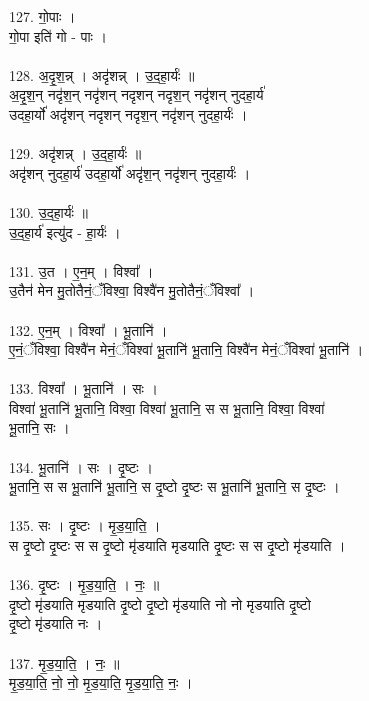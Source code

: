 127. गो॒पाः ।\\
गो॒पा इति॑ गो - पाः ।\\
\\
128. अ॒दृ॒श॒न्न् । अदृ॑शन्न् । उ॒द॒हा॒र्यः॑ ॥\\
अ॒दृ॒श॒न् नदृ॑श॒न् नदृ॑शन् नदृशन् नदृश॒न् नदृ॑शन् नुदहा॒र्य॑\\
उदहा॒र्यो॑ अदृ॑शन् नदृशन् नदृश॒न् नदृ॑शन् नुदहा॒र्यः॑ ।\\
\\
129. अदृ॑शन्न् । उ॒द॒हा॒र्यः॑ ॥\\
अदृ॑शन् नुदहा॒र्य॑ उदहा॒र्यो॑ अदृ॑श॒न् नदृ॑शन् नुदहा॒र्यः॑ ।\\
\\
130. उ॒द॒हा॒र्यः॑ ॥\\
उ॒द॒हा॒र्य॑ इत्यु॑द - हा॒र्यः॑ ।\\
\\
131. उ॒त । ए॒न॒म् । विश्वा᳚ ।\\
उ॒तैन॑ मेन मु॒तोतैनं॒ँविश्वा॒ विश्वै॑न मु॒तोतैनं॒ँविश्वा᳚ ।\\
\\
132. ए॒न॒म् । विश्वा᳚ । भू॒तानि॑ ।\\
ए॒नं॒ँविश्वा॒ विश्वै॑न मेनं॒ँविश्वा॑ भू॒तानि॑ भू॒तानि॒ विश्वै॑न मेनं॒ँविश्वा॑ भू॒तानि॑ ।\\
\\
133. विश्वा᳚ । भू॒तानि॑ । सः ।\\
विश्वा॑ भू॒तानि॑ भू॒तानि॒ विश्वा॒ विश्वा॑ भू॒तानि॒ स स भू॒तानि॒ विश्वा॒ विश्वा॑\\
भू॒तानि॒ सः ।\\
\\
134. भू॒तानि॑ । सः । दृ॒ष्टः ।\\
भू॒तानि॒ स स भू॒तानि॑ भू॒तानि॒ स दृ॒ष्टो दृ॒ष्टः स भू॒तानि॑ भू॒तानि॒ स दृ॒ष्टः ।\\
\\
135. सः । दृ॒ष्टः । मृ॒ड॒या॒ति॒ ।\\
स दृ॒ष्टो दृ॒ष्टः स स दृ॒ष्टो मृ॑डयाति मृडयाति दृ॒ष्टः स स दृ॒ष्टो मृ॑डयाति ।\\
\\
136. दृ॒ष्टः । मृ॒ड॒या॒ति॒ । नः॒ ॥\\
दृ॒ष्टो मृ॑डयाति मृडयाति दृ॒ष्टो दृ॒ष्टो मृ॑डयाति नो नो मृडयाति दृ॒ष्टो\\
दृ॒ष्टो मृ॑डयाति नः ।\\
\\
137. मृ॒ड॒या॒ति॒ । नः॒ ॥\\
मृ॒ड॒या॒ति॒ नो॒ नो॒ मृ॒ड॒या॒ति॒ मृ॒ड॒या॒ति॒ नः॒ ।\\
\\
